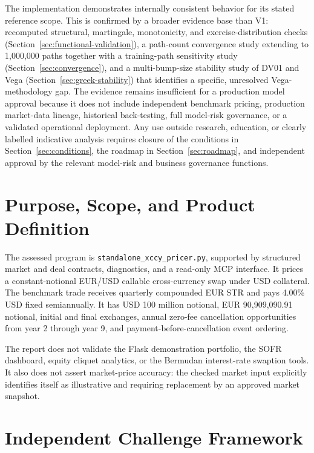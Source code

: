 \documentclass[conference]{IEEEtran}
\begin{document}
The implementation demonstrates internally consistent behavior for its stated reference scope. This is confirmed by a broader evidence base than V1: recomputed structural, martingale, monotonicity, and exercise-distribution checks (Section~\ref{sec:functional-validation}), a path-count convergence study extending to 1,000,000 paths together with a training-path sensitivity study (Section~\ref{sec:convergence}), and a multi-bump-size stability study of DV01 and Vega (Section~\ref{sec:greek-stability}) that identifies a specific, unresolved Vega-methodology gap. The evidence remains insufficient for a production model approval because it does not include independent benchmark pricing, production market-data lineage, historical back-testing, full model-risk governance, or a validated operational deployment. Any use outside research, education, or clearly labelled indicative analysis requires closure of the conditions in Section~\ref{sec:conditions}, the roadmap in Section~\ref{sec:roadmap}, and independent approval by the relevant model-risk and business governance functions.

\section{Purpose, Scope, and Product Definition}

The assessed program is \texttt{standalone\_xccy\_pricer.py}, supported by structured market and deal contracts, diagnostics, and a read-only MCP interface. It prices a constant-notional EUR/USD callable cross-currency swap under USD collateral. The benchmark trade receives quarterly compounded EUR \texteuro STR and pays 4.00\% USD fixed semiannually. It has USD 100 million notional, EUR 90,909,090.91 notional, initial and final exchanges, annual zero-fee cancellation opportunities from year 2 through year 9, and payment-before-cancellation event ordering.

The report does not validate the Flask demonstration portfolio, the SOFR dashboard, equity cliquet analytics, or the Bermudan interest-rate swaption tools. It also does not assert market-price accuracy: the checked market input explicitly identifies itself as illustrative and requiring replacement by an approved market snapshot.

\section{Independent Challenge Framework}
\end{document}
